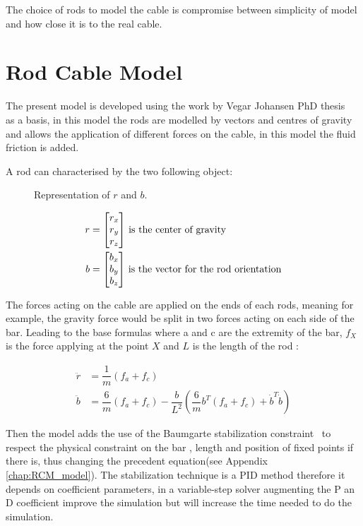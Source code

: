 The choice of rods to model the cable is compromise between simplicity of model and how close it is to the real cable.

\section{Rod Cable Model}

The present model is developed using the work by Vegar Johansen PhD thesis~\cite{johansen2007modelling} as a basis, in this model the rods are modelled by vectors and centres of gravity and allows the application of different forces on the cable, in this model the fluid friction is added.

A rod can characterised by the two following object:

\begin{figure}[H]
\centering
{} %
{

}
\caption{Representation of $r$ and $b$.}
\label{fig:draw_ref_rb}
\end{figure}

\begin{align}
r &= \begin{bmatrix}
    r_x \\
    r_y \\
    r_z
\end{bmatrix}\, \textnormal{is the center of gravity}\\
b &= \begin{bmatrix}
    b_x \\
    b_y \\
    b_z
\end{bmatrix}\, \textnormal{is the vector for the rod orientation}
\end{align}

The forces acting on the cable are applied on the ends of each rods, meaning for example, the gravity force would be split in two forces acting on each side of the bar. Leading to the base formulas where a and c are the extremity of the bar, $f_X$ is the force applying at the point $X$ and $L$ is the length of the rod :

\begin{align}
\ddot{r} &= \dfrac{1}{m}  (f_a+f_c) \\
\ddot{b} &=  \dfrac{6}{m}(f_a+f_c) - \dfrac{b}{L^{2}}  (\dfrac{6}{m}b^{T}(f_a+f_c)+\dot{b}^{T}\dot{b}) 
\end{align}



Then the model adds the use of the Baumgarte stabilization constraint~\cite{baumgarte1972stabilization} to respect the physical constraint on the bar , length and position of fixed points if there is, thus changing the precedent equation(see Appendix \ref{chap:RCM_model}). 
The stabilization technique is a PID method therefore it depends on coefficient parameters, in a variable-step solver augmenting the P an D coefficient improve the simulation but will increase the time needed to do the simulation.

